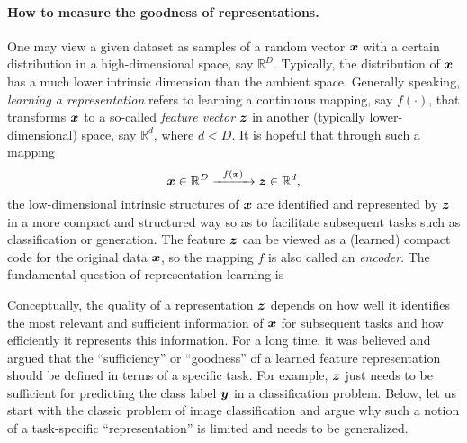 \documentclass[../../book-main.tex]{subfiles}
\begin{document}
\paragraph{How to measure the goodness of representations.}
One may view a given dataset as samples of a random vector $\bm{x}$ with a certain distribution in a high-dimensional space, say $\mathbb{R}^D$. Typically, the distribution of $\bm{x}$ has a much lower intrinsic dimension than the ambient space. Generally speaking,  {\em learning a representation} refers to learning a continuous mapping, say $f(\cdot)$, that transforms $\bm{x}$ to a so-called {\em feature vector} $\bm{z}$ in another (typically lower-dimensional) space, say $\mathbb{R}^d$, where $d < D$. It is hopeful that through such a mapping
\begin{equation}
	\bm{x} \in \mathbb{R}^D \xrightarrow{\hspace{2mm} f(\bm{x})\hspace{2mm}} \bm{z}  \in \mathbb{R}^d,
	\label{eqn:chap4-1-encoding}
\end{equation}
the low-dimensional intrinsic structures of $\bm{x}$ are identified and represented by $\bm{z}$ in a more compact and structured way so as to facilitate subsequent tasks such as classification or generation. The feature $\bm{z}$ can be viewed as a (learned) compact code for the original data $\bm{x}$, so the mapping $f$ is also called an \textit{encoder}.
The fundamental question of representation learning is
\begin{center}
\end{center}

Conceptually, the quality of a representation $\bm{z}$ depends on how well it identifies the most relevant and sufficient information of $\bm{x}$ for subsequent tasks and how efficiently it represents this information.
For a long time, it was believed and argued that the ``sufficiency'' or ``goodness'' of a learned feature representation should be defined in terms of a specific task. For example, $\bm{z}$ just needs to be sufficient for predicting the class label $\bm{y}$ in a classification problem. Below, let us start with the classic problem of image classification and argue why such a notion of a task-specific ``representation'' is limited and needs to be generalized.

\end{document}
